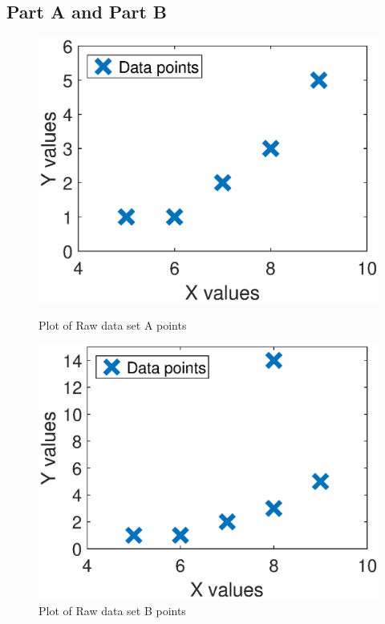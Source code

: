 \documentclass[12pt]{article}
\begin{document}
\subsection{Part A and Part B}
\begin{figure}[h]
\centering
\begin{minipage}{0.5\textwidth}
\centering	
\includegraphics[scale=0.50]{dataA}
	\caption{Plot of Raw data set A points }
	\label{fig:dataA}
\end{minipage}%
\centering	
\begin{minipage}{0.5\textwidth}
\centering	
\includegraphics[scale=0.50]{dataB}
	\caption{Plot of Raw data set B points }
	\label{fig:dataB}
\end{minipage}
\end{figure}
\end{document}
